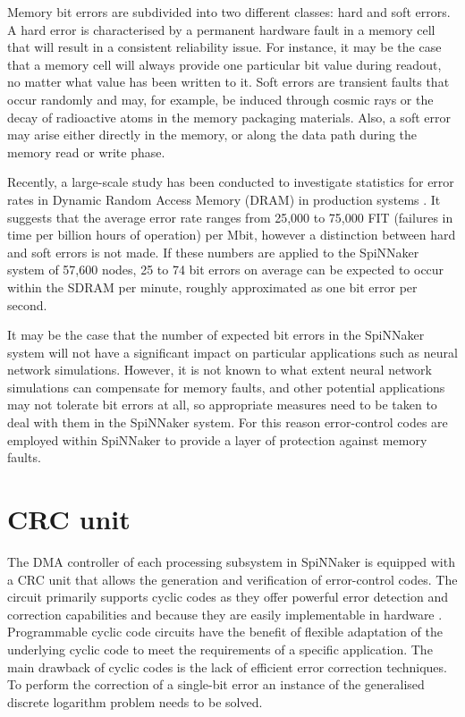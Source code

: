 \documentclass[oneside, a4paper, 11pt]{memoir}
\begin{document}
Memory bit errors are subdivided into two different classes: hard and soft errors. A hard error is characterised by a permanent hardware fault in a memory cell that will result in a consistent reliability issue. For instance, it may be the case that a memory cell will always provide one particular bit value during readout, no matter what value has been written to it. Soft errors are transient faults that occur randomly and may, for example, be induced through cosmic rays or the decay of radioactive atoms in the memory packaging materials. Also, a soft error may arise either directly in the memory, or along the data path during the memory read or write phase.

Recently, a large-scale study has been conducted to investigate statistics for error rates in Dynamic Random Access Memory (DRAM) in production systems \citep{schroeder2009dram}. It suggests that the average error rate ranges from 25,000 to 75,000 FIT (failures in time per billion hours of operation) per Mbit, however a distinction between hard and soft errors is not made. If these numbers are applied to the SpiNNaker system of 57,600 nodes, 25 to 74 bit errors on average can be expected to occur within the SDRAM per minute, roughly approximated as one bit error per second.

It may be the case that the number of expected bit errors in the SpiNNaker system will not have a significant impact on particular applications such as neural network simulations. However, it is not known to what extent neural network simulations can compensate for memory faults, and other potential applications may not tolerate bit errors at all, so appropriate measures need to be taken to deal with them in the SpiNNaker system. For this reason error-control codes are employed within SpiNNaker to provide a layer of protection against memory faults.

\section{CRC unit}
The DMA controller of each processing subsystem in SpiNNaker is equipped with a CRC unit that allows the generation and verification of error-control codes. The circuit primarily supports cyclic codes as they offer powerful error detection and correction capabilities and because they are easily implementable in hardware \citep{costello2004error}. Programmable cyclic code circuits have the benefit of flexible adaptation of the underlying cyclic code to meet the requirements of a specific application. The main drawback of cyclic codes is the lack of efficient error correction techniques. To perform the correction of a single-bit error an instance of the generalised discrete logarithm problem needs to be solved.
\end{document}
